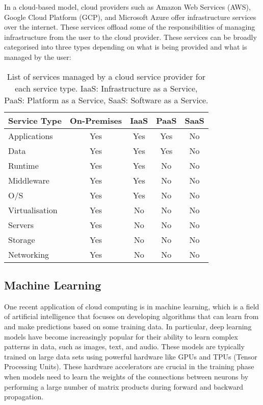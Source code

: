 \documentclass{article}
\begin{document}
In a cloud-based model, cloud providers such as Amazon Web Services
(AWS), Google Cloud Platform (GCP), and Microsoft Azure offer
infrastructure services over the internet. These services offload some
of the responsibilities of managing infrastructure from the user to the
cloud provider. These services can be broadly categorised into three
types depending on what is being provided and what is managed by the
user:
\begin{table}[H]
    \centering
    \begin{tabular}{l|cccc}
        \toprule
        \textbf{Service Type} & \textbf{On-Premises} & \textbf{IaaS} & \textbf{PaaS} & \textbf{SaaS} \\
        \midrule
        Applications          & Yes                  & Yes           & Yes           & No            \\
        Data                  & Yes                  & Yes           & Yes           & No            \\
        Runtime               & Yes                  & Yes           & No            & No            \\
        Middleware            & Yes                  & Yes           & No            & No            \\
        O/S                   & Yes                  & Yes           & No            & No            \\
        Virtualisation        & Yes                  & No            & No            & No            \\
        Servers               & Yes                  & No            & No            & No            \\
        Storage               & Yes                  & No            & No            & No            \\
        Networking            & Yes                  & No            & No            & No            \\
        \bottomrule
    \end{tabular}
    \caption{List of services managed by a cloud service provider for each service type.
        IaaS: Infrastructure as a Service, PaaS: Platform as a Service, SaaS: Software as a Service.}
\end{table}
\subsection{Machine Learning}
One recent application of cloud computing is in machine learning, which
is a field of artificial intelligence that focuses on developing
algorithms that can learn from and make predictions based on some
training data. In particular, deep learning models have become
increasingly popular for their ability to learn complex patterns in
data, such as images, text, and audio. These models are typically
trained on large data sets using powerful hardware like GPUs and TPUs
(Tensor Processing Units). These hardware accelerators are crucial in
the training phase when models need to learn the weights of the
connections between neurons by performing a large number of matrix
products during forward and backward propagation.
\end{document}
